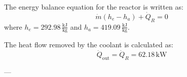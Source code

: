 The energy balance equation for the reactor is written as:  
\[
\dot{m}(h_e - h_a) + \dot{Q}_R = 0
\]  
where \( h_e = 292.98 \, \frac{\text{kJ}}{\text{kg}} \) and \( h_a = 419.09 \, \frac{\text{kJ}}{\text{kg}} \).  

The heat flow removed by the coolant is calculated as:  
\[
\dot{Q}_{\text{out}} = \dot{Q}_R = 62.18 \, \text{kW}
\]  

---